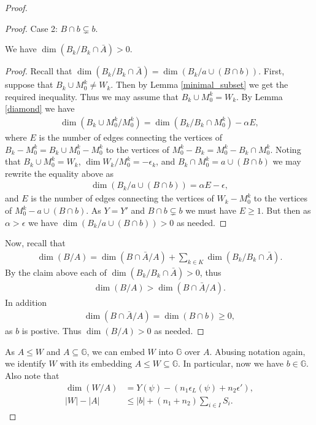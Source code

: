 \documentclass{amsart}
\newcommand{\GG}{\mathbb G}
\newcommand{\BA}{\bar A}
\newcommand{\Y}{Y}
\newcommand{\paren}[1]{\left(#1\right)}
\begin{document}
\begin{proof}
\begin{proof}
    Case 2: $B \cap b \subsetneq b$.
    \begin{Claim} We have $\dim(B_k / B_k \cap \BA) > 0$.
    \end{Claim}
    \begin{proof}
      Recall that $\dim(B_k / B_k \cap \BA) = \dim(B_k / a \cup (B \cap b))$.
      First, suppose that $B_k \cup M_0^k \neq W_k$.
      Then by Lemma \ref{minimal_subset} we get the required inequality.
      Thus we may assume that $B_k \cup M_0^k = W_k$.
      By Lemma \ref{diamond} we have
      \begin{align*}
        \dim(B_k \cup M_0^k / M_0^k) = \dim(B_k / B_k \cap M_0^k) - \alpha E,
      \end{align*}
      where $E$ is the number of edges connecting the vertices of
      $B_k - M_0^k = B_k \cup M_0^k - M_0^k$ to the vertices of $M_0^k - B_k = M_0^k - B_k \cap M_0^k$.
      Noting that $B_k \cup M_0^k = W_k$, $\dim{W_k / M_0^k} = -\epsilon_k$, and $B_k \cap M_0^k = a \cup (B \cap b)$
      we may rewrite the equality above as
      \begin{align*}
        \dim(B_k / a \cup (B \cap b)) = \alpha E - \epsilon,
      \end{align*}
      and $E$ is the number of edges connecting the vertices of $W_k - M_0^k$ to the vertices of $M_0^k - a \cup (B \cap b)$.
      As $\Y = \Y'$ and $B \cap b \subsetneq b$ we must have $E \geq 1$.
      But then as $\alpha > \epsilon$ we have $\dim(B_k / a \cup (B \cap b)) > 0$ as needed.
    \end{proof}
    Now, recall that
    \begin{align*}
      \dim(B/A) = \dim(B \cap \BA / A) + \sum_{k \in K} \dim(B_k/ B_k \cap \BA).
    \end{align*}
    By the claim above each of $\dim(B_k/ B_k \cap \BA) > 0$, thus
    \begin{align*}
      \dim(B/A) > \dim(B \cap \BA / A).
    \end{align*}
    In addition
    \begin{align*}
      \dim(B \cap \BA / A) = \dim (B \cap b) \geq 0,
    \end{align*}
    as $b$ is postive.
    Thus $\dim (B/A) > 0$ as needed.
  \end{proof}

  As $A \leq W$ and $A \subseteq \GG$, we can embed $W$ into $\GG$ over $A$.
  Abusing notation again, we identify $W$ with its embedding $A \leq W \subseteq \GG$.
  In particular, now we have $b \in \GG$.
  Also note that
  \begin{align*}
    \dim(W/A) &= Y(\psi) - \paren{n_1 \epsilon_L(\psi) + n_2 \epsilon'}, \\
    |W| - |A| &\leq |b| + (n_1 + n_2) \sum_{i \in I} S_i.
  \end{align*}


\end{proof}
\end{document}
